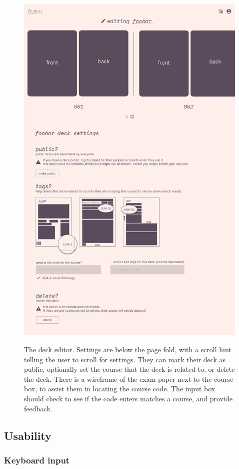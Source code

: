 \documentclass{report}
\begin{document}
\begin{figure}[H]
  \centering
  \includegraphics[height=17.5cm]{./media/ui/deck.png}
  \label{fig:editor1}
  \caption{The deck editor. Settings are below the page fold, with a scroll hint telling the user to scroll for settings. They can mark their deck as public, optionally set the course that the deck is related to, or delete the deck. There is a wireframe of the exam paper next to the course box, to assist them in locating the course code. The input box should check to see if the code enters matches a course, and provide feedback.}
\end{figure}

\subsection{Usability}
\subsubsection{Keyboard input}
\end{document}
